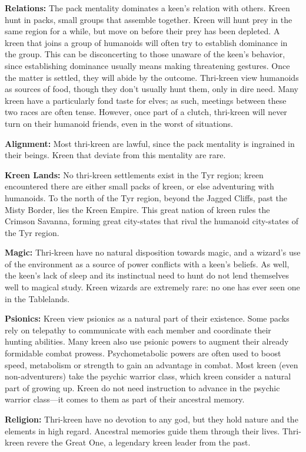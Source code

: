 \textbf{Relations:} The pack mentality dominates a keen's relation with others. Kreen hunt in packs, small groups that assemble together. Kreen will hunt prey in the same region for a while, but move on before their prey has been depleted. A kreen that joins a group of humanoids will often try to establish dominance in the group. This can be disconcerting to those unaware of the keen's behavior, since establishing dominance usually means making threatening gestures. Once the matter is settled, they will abide by the outcome. Thri-kreen view humanoids as sources of food, though they don't usually hunt them, only in dire need. Many kreen have a particularly fond taste for elves; as such, meetings between these two races are often tense. However, once part of a clutch, thri-kreen will never turn on their humanoid friends, even in the worst of situations.

\textbf{Alignment:} Most thri-kreen are lawful, since the pack mentality is ingrained in their beings. Kreen that deviate from this mentality are rare.

\textbf{Kreen Lands:} No thri-kreen settlements exist in the Tyr region; kreen encountered there are either small packs of kreen, or else adventuring with humanoids. To the north of the Tyr region, beyond the Jagged Cliffs, past the Misty Border, lies the Kreen Empire. This great nation of kreen rules the Crimson Savanna, forming great city-states that rival the humanoid city-states of the Tyr region.

\textbf{Magic:} Thri-kreen have no natural disposition towards magic, and a wizard's use of the environment as a source of power conflicts with a keen's beliefs. As well, the keen's lack of sleep and its instinctual need to hunt do not lend themselves well to magical study. Kreen wizards are extremely rare: no one has ever seen one in the Tablelands.

\textbf{Psionics:} Kreen view psionics as a natural part of their existence. Some packs rely on telepathy to communicate with each member and coordinate their hunting abilities. Many kreen also use psionic powers to augment their already formidable combat prowess. Psychometabolic powers are often used to boost speed, metabolism or strength to gain an advantage in combat. Most kreen (even non-adventurers) take the psychic warrior class, which kreen consider a natural part of growing up. Kreen do not need instruction to advance in the psychic warrior class---it comes to them as part of their ancestral memory.

\textbf{Religion:} Thri-kreen have no devotion to any god, but they hold nature and the elements in high regard. Ancestral memories guide them through their lives. Thri-kreen revere the Great One, a legendary kreen leader from the past.

